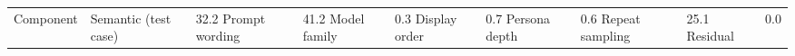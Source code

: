 \begin{tabular}{ll}
\toprule
Component & %
\midrule
Semantic (test case) & 32.2%
Prompt wording & 41.2%
Model family & 0.3%
Display order & 0.7%
Persona depth & 0.6%
Repeat sampling & 25.1%
Residual & 0.0%
\bottomrule
\end{tabular}

